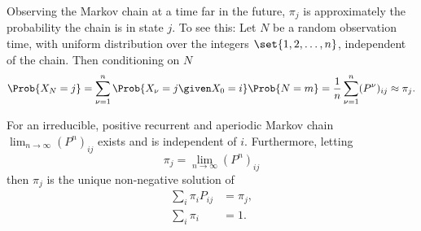 \documentclass[12pt]{article}
\begin{document}
\begin{remark}
    Observing the Markov chain at a time far in the future, \( \pi_j \)
    is approximately the probability the chain is in state \( j \).  To see this:  Let
    \( N \) be a random observation time, with uniform distribution over
    the integers \( \set{1, 2, \dots, n} \), independent of the chain.
    Then conditioning on \( N \)
    \[
        \Prob{X_N = j} = \sum\limits_{\nu=1}^n \Prob{X_{\nu} = j \given
        X_0 = i} \Prob{N = m} = \frac{1}{n} \sum\limits_{\nu=1}^n (P^{\nu})_
        {ij} \approx \pi_j.
    \]
\end{remark}

\begin{theorem}
    For an irreducible, positive recurrent and aperiodic Markov chain \(
    \lim_{n \to \infty} (P^n)_{ij} \) exists and is independent of \( i \).
    Furthermore, letting
    \[
        \pi_j = \lim_{n \to \infty} (P^n)_{ij}
    \] then \( \pi_j \) is the unique non-negative solution of
    \begin{align}
        \sum\limits_{i} \pi_{i} P_{ij} &= \pi_{j},%
        \label{eq:stationarydistributions:FTMC1}\\
        \sum\limits_{i} \pi_{i} &= 1.%
        \label{eq:stationarydistributions:FTMC2}
    \end{align}
\end{theorem}
\end{document}
